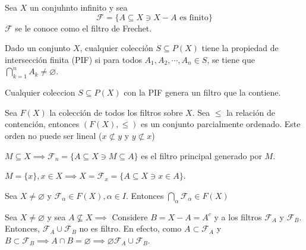 \documentclass[a4paper, 12pt]{article}
\begin{document}
\begin{ejemplo}
    Sea $X$ un conjuhnto infinito y sea 
    $$\mathcal{F}=\{A\subseteq X\ni X-A \text{ es finito}\}$$
    $\mathcal{F}$ se le conoce como el filtro de Frechet. 
\end{ejemplo}

\begin{cajita}
    Dado un conjunto $X$, cualquier colección $S\subseteq P(X)$ tiene la propiedad de intersección finita (PIF) si para todos  $A_1,A_2,\cdots, A_n\in S$, se tiene que $\bigcap_{k=1}^n A_k\neq \varnothing$. 

\end{cajita}
\begin{nota}
    Cualquier coleccion $S\subseteq P(X)$ con la PIF genera un filtro que la contiene. 
\end{nota}

\begin{nota}
    Sea $F(X)$ la colección de todos los filtros sobre $X$. Sea $\leq$ la relación de contención, entonces $(F(X),\leq)$ es un conjunto parcialmente ordenado. Este orden no puede ser lineal ($x\not\subset y$ y $y\not\subset x$)
\end{nota}


\begin{ejemplo}
    $M\subseteq X\implies \mathcal{F}_n=\{A\subseteq X\ni M\subseteq A\}$ es el filtro principal generado por $M$. 
\end{ejemplo}
\begin{ejemplo}
    $M=\{x\},x\in X\implies X=\mathcal{F}_x=\{A\subseteq X\ni x\in A\}$. 
\end{ejemplo}


\begin{teorema}
    Sea $X\neq \varnothing$ y $\mathcal{F}_\alpha\in F(X),\alpha\in I$. Entonces $\bigcap_\alpha \mathcal{F}_\alpha \in F(X)$

\end{teorema}

\begin{nota}
    Sea $X\neq\varnothing$ y sea $A\not\subseteq X\implies$ Considere $B=X-A=A^c$ y a los filtros $\mathcal{F}_A$ y $\mathcal{F}_B$. Entonces, $\mathcal{F}_A\cup \mathcal{F}_B$ no es filtro. En efecto, como $A\subset \mathcal{F}_A$ y $B\subset \mathcal{F}_B\implies A\cap B=\varnothing\implies \varnothing \mathcal{F}_A\cup \mathcal{F}_B$. 
\end{nota}
\end{document}
